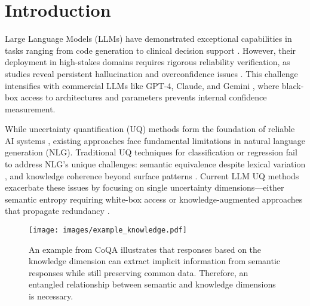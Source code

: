 


\section{Introduction}

Large Language Models (LLMs) have demonstrated exceptional capabilities in tasks ranging from code generation to clinical decision support \citep{du2024evaluating,cascella2023evaluating}. However, their deployment in high-stakes domains requires rigorous reliability verification, as studies reveal persistent hallucination and overconfidence issues \citep{huang2024trustllm,yao2023llm}. This challenge intensifies with commercial LLMs like GPT-4, Claude, and Gemini \citep{achiam2023gpt-4,anthropic2024claude, team2023gemini}, where black-box access to architectures and parameters prevents internal confidence measurement.

While uncertainty quantification (UQ) methods form the foundation of reliable AI systems \citep{wang2025aleatoric}, existing approaches face fundamental limitations in natural language generation (NLG). Traditional UQ techniques for classification \citep{gal2016dropout} or regression \citep{ye2024uncertainty} fail to address NLG's unique challenges: semantic equivalence despite lexical variation \citep{kuhn2023semantic}, and knowledge coherence beyond surface patterns \citep{choi2024fact}. Current LLM UQ methods exacerbate these issues by focusing on single uncertainty dimensions—either semantic entropy requiring white-box access \citep{kuhn2023semantic} or knowledge-augmented approaches that propagate redundancy \citep{da2024llm}.

\begin{figure}[h]
    \centering
    \texttt{[image: images/example\_knowledge.pdf]}
    \caption{An example from CoQA illustrates that responses based on the knowledge dimension can extract implicit information from semantic responses while still preserving common data. Therefore, an entangled relationship between semantic and knowledge dimensions is necessary.}
    \vspace{-5mm}
    \label{fig:Knowledge_example}
\end{figure}




